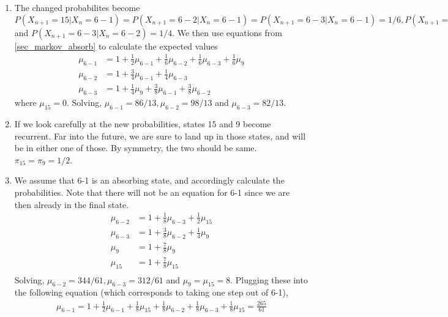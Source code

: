 \documentclass[11pt, a4paper]{article}
\begin{document}
\begin{enumerate}
\begin{enumerate}
            \item The changed probabilites become $P(X_{n+1}=15|X_{n}=6-1) = P(X_{n+1}=6-2|X_{n}=6-1) = P(X_{n+1}=6-3|X_{n}=6-1) = 1/6, P(X_{n+1}=6-1|X_{n}=6-2)=3/4$ and $P(X_{n+1}=6-3|X_{n}=6-2)=1/4$. We then use equations from \ref{sec_markov_absorb} to calculate the expected values
            \begin{align*}
                \mu_{6-1} &= 1 + \frac{1}{2}\mu_{6-1} + \frac{1}{6} \mu_{6-2} + \frac{1}{6} \mu_{6-3} + \frac{1}{6}\mu_{9}\\
                \mu_{6-2} &= 1 + \frac{3}{4}\mu_{6-1} + \frac{1}{4}\mu_{6-3}\\
                \mu_{6-3} &= 1 + \frac{1}{4}\mu_{9} + \frac{3}{8}\mu_{6-1} + \frac{3}{8}\mu_{6-2}
            \end{align*}
            where $\mu_{15} = 0$. Solving, $\mu_{6-1} = 86/13, \mu_{6-2} = 98/13$ and $\mu_{6-3} = 82/13$.

            \item If we look carefully at the new probabilities, states 15 and 9 become recurrent. Far into the future, we are sure to land up in those states, and will be in either one of those. By symmetry, the two should be same. $\pi_{15} = \pi_{9} = 1/2$.

            \item We assume that 6-1 is an absorbing state, and accordingly calculate the probabilities. Note that there will not be an equation for 6-1 since we are then already in the final state.
            \begin{align*}
                \mu_{6-2} &= 1 + \frac{1}{8} \mu_{6-3} + \frac{1}{2} \mu_{15}\\
                \mu_{6-3} &= 1 + \frac{3}{8} \mu_{6-2} + \frac{1}{4} \mu_{9}\\
                \mu_{9} &= 1 + \frac{7}{8} \mu_{9}\\
                \mu_{15} &= 1 + \frac{7}{8} \mu_{15}\\
            \end{align*}
            Solving, $\mu_{6-2} = 344/61, \mu_{6-3} = 312/61$ and $\mu_{9} = \mu_{15} = 8$. Plugging these into the following equation (which corresponds to taking one step out of 6-1),
            \begin{align*}
                \mu_{6-1} = 1 + \frac{1}{2} \mu_{6-1} + \frac{1}{8} \mu_{15} + \frac{1}{8} \mu_{6-2} + \frac{1}{8} \mu_{6-3} + \frac{1}{8} \mu_{15} = \frac{265}{61}
            \end{align*}
        \end{enumerate}



\end{enumerate}
\end{document}
